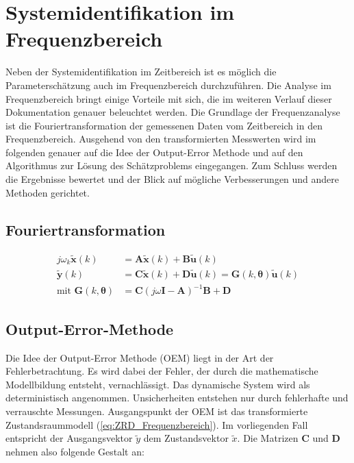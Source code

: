 \chapter{Systemidentifikation im Frequenzbereich}

Neben der Systemidentifikation im Zeitbereich ist es möglich die Parameterschätzung auch im Frequenzbereich durchzuführen. Die Analyse im Frequenzbereich bringt einige Vorteile mit sich, die im weiteren Verlauf dieser Dokumentation genauer beleuchtet werden. Die Grundlage der Frequenzanalyse ist die Fouriertransformation der gemessenen Daten vom Zeitbereich in den Frequenzbereich. Ausgehend von den transformierten Messwerten wird im folgenden genauer auf die Idee der Output-Error Methode und auf den Algorithmus zur Lösung des Schätzproblems eingegangen. Zum Schluss werden die Ergebnisse bewertet und der Blick auf mögliche Verbesserungen und andere Methoden gerichtet.

\section{Fouriertransformation}  

\begin{align}
	j\omega_{k}\mathbf{\tilde{x}}(k)  &= \mathbf{A\tilde{x}}(k) + \mathbf{B\tilde{u}}(k) \nonumber \\
 	\mathbf{\tilde{y}}(k)             &= \mathbf{C\tilde{x}}(k) + \mathbf{D\tilde{u}}(k) = \mathbf{G}(k,\mathbf{\theta})\mathbf{\tilde{u}}(k) \nonumber \\
 	\text{mit }\mathbf{G}(k,\mathbf{\theta}) &= \mathbf{C}(j\omega\mathbf{I}-\mathbf{A})^{-1}\mathbf{B}+\mathbf{D}
	\label{eq:ZRD_Frequenzbereich}
\end{align}

\section{Output-Error-Methode}

Die Idee der Output-Error Methode (OEM) liegt in der Art der Fehlerbetrachtung. Es wird dabei der Fehler, der durch die mathematische Modellbildung entsteht, vernachlässigt. Das dynamische System wird als deterministisch angenommen. Unsicherheiten entstehen nur durch fehlerhafte und verrauschte Messungen. Ausgangspunkt der OEM ist das transformierte Zustandsraummodell (\ref{eq:ZRD_Frequenzbereich}). Im vorliegenden Fall entspricht der Ausgangsvektor $\tilde{y}$ dem Zustandsvektor $\tilde{x}$. Die Matrizen $\mathbf{C}$ und $\mathbf{D}$ nehmen also folgende Gestalt an:

